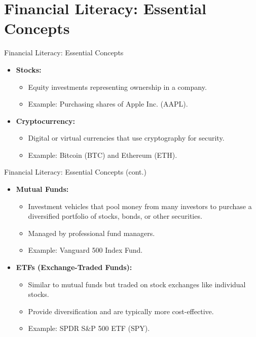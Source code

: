 \documentclass{beamer}
\begin{document}
\section{Financial Literacy: Essential Concepts}
\begin{frame}{Financial Literacy: Essential Concepts}
    \begin{itemize}
        \item \textbf{Stocks:}
        \begin{itemize}
            \item Equity investments representing ownership in a company.
            \item Example: Purchasing shares of Apple Inc. (AAPL).
        \end{itemize}
        \item \textbf{Cryptocurrency:}
        \begin{itemize}
            \item Digital or virtual currencies that use cryptography for security.
            \item Example: Bitcoin (BTC) and Ethereum (ETH).
        \end{itemize}
    \end{itemize}
\end{frame}

\begin{frame}{Financial Literacy: Essential Concepts (cont.)}
    \begin{itemize}
        \item \textbf{Mutual Funds:}
        \begin{itemize}
            \item Investment vehicles that pool money from many investors to purchase a diversified portfolio of stocks, bonds, or other securities.
            \item Managed by professional fund managers.
            \item Example: Vanguard 500 Index Fund.
        \end{itemize}
        \item \textbf{ETFs (Exchange-Traded Funds):}
        \begin{itemize}
            \item Similar to mutual funds but traded on stock exchanges like individual stocks.
            \item Provide diversification and are typically more cost-effective.
            \item Example: SPDR S&P 500 ETF (SPY).
        \end{itemize}
    \end{itemize}
\end{frame}
\end{document}
